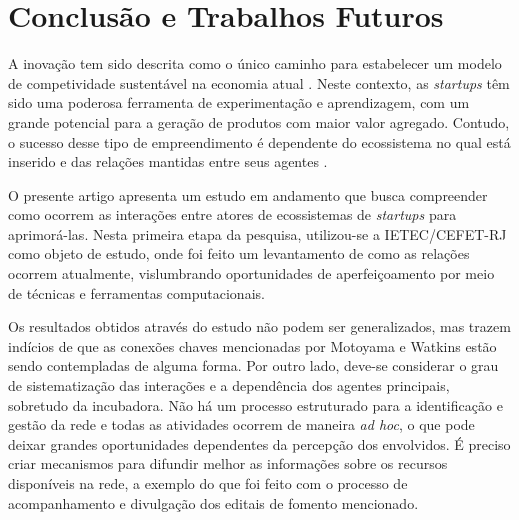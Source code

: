 \documentclass{sig-alternate-05-2015}
\begin{document}
\section{Conclusão e Trabalhos Futuros}
A inovação tem sido descrita como o único caminho para estabelecer um modelo de competividade sustentável na economia atual \cite{weiblen-chesbrough-2016}. Neste contexto, as \textit{startups} têm sido uma poderosa ferramenta de experimentação e aprendizagem, com um grande potencial para a geração de produtos com maior valor agregado. Contudo, o sucesso desse tipo de empreendimento é dependente do ecossistema no qual está inserido e das relações mantidas entre seus agentes \cite{blankdorf-12}\cite{candido-souza-15}\cite{motoyama-waltins-2014}. 


O presente artigo apresenta um estudo em andamento que busca compreender como ocorrem as interações entre atores de ecossistemas de \textit{startups} para aprimorá-las. Nesta primeira etapa da pesquisa, utilizou-se a IETEC/CEFET-RJ como objeto de estudo, onde foi feito um levantamento de como as relações ocorrem atualmente, vislumbrando oportunidades de aperfeiçoamento por meio de técnicas e ferramentas computacionais.

Os resultados obtidos através do estudo não podem ser generalizados, mas trazem indícios de que as conexões chaves mencionadas por Motoyama e Watkins \cite{motoyama-waltins-2014} estão sendo contempladas de alguma forma. Por outro lado, deve-se considerar o grau de sistematização das interações e a dependência dos agentes principais, sobretudo da incubadora. Não há um processo estruturado para a identificação e gestão da rede e todas as atividades ocorrem de maneira \textit{ad hoc}, o que pode deixar grandes oportunidades dependentes da percepção dos envolvidos. É preciso criar mecanismos para difundir melhor as informações sobre os recursos disponíveis na rede, a exemplo do que foi feito com o processo de acompanhamento e divulgação dos editais de fomento mencionado.
\end{document}
